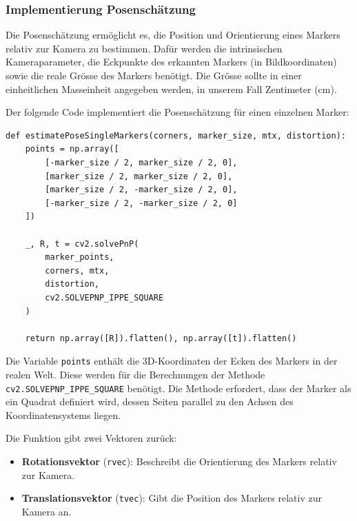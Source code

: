 \clearpage
\subsubsection{Implementierung Posenschätzung}
Die Posenschätzung ermöglicht es, die Position und Orientierung eines Markers relativ zur Kamera
zu bestimmen. Dafür werden die intrinsischen Kameraparameter, die Eckpunkte des erkannten 
Markers (in Bildkoordinaten) sowie die reale Grösse des Markers benötigt. Die Grösse sollte 
in einer einheitlichen Masseinheit angegeben werden, in unserem Fall Zentimeter (cm).

Der folgende Code implementiert die Posenschätzung für einen einzelnen Marker:



\begin{lstlisting}
def estimatePoseSingleMarkers(corners, marker_size, mtx, distortion):
    points = np.array([
        [-marker_size / 2, marker_size / 2, 0],
        [marker_size / 2, marker_size / 2, 0],
        [marker_size / 2, -marker_size / 2, 0],
        [-marker_size / 2, -marker_size / 2, 0]
    ])

    _, R, t = cv2.solvePnP(
        marker_points, 
        corners, mtx, 
        distortion,
        cv2.SOLVEPNP_IPPE_SQUARE
    )
    
    return np.array([R]).flatten(), np.array([t]).flatten()
\end{lstlisting}

Die Variable \texttt{points} enthält die 3D-Koordinaten der Ecken des Markers in der realen Welt. 
Diese werden für die Berechnungen der Methode  \texttt{cv2.SOLVEPNP\_IPPE\_SQUARE} benötigt. 
Die Methode erfordert, dass der Marker als ein Quadrat definiert wird, dessen Seiten parallel 
zu den Achsen des Koordinatensystems liegen.

Die Funktion gibt zwei Vektoren zurück:
\begin{itemize}
    \item \textbf{Rotationsvektor} (\texttt{rvec}): Beschreibt die Orientierung des Markers relativ zur Kamera.
    \item \textbf{Translationsvektor} (\texttt{tvec}): Gibt die Position des Markers relativ zur Kamera an.
\end{itemize}

